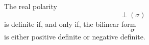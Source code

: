 The real polarity $$\perp(\sigma)$$ is definite if, and only if, the bilinear form $$\sigma$$ is either positive definite or negative definite.
